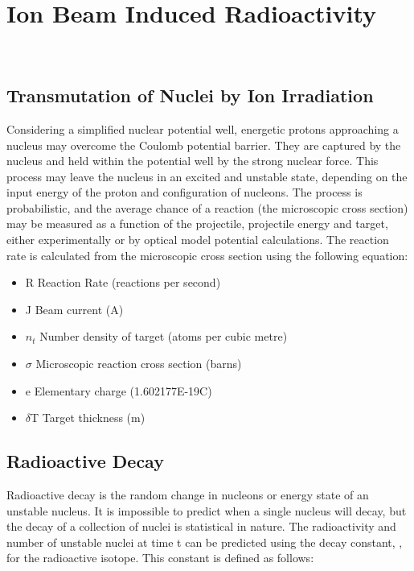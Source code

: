 
\section{Ion Beam Induced Radioactivity} 

\subsection{Transmutation of Nuclei by Ion Irradiation}

Considering a simplified nuclear potential well, energetic protons approaching a nucleus may overcome the Coulomb potential barrier.  They are captured by the nucleus and held within the potential well by the strong nuclear force.  This process may leave the nucleus in an excited and unstable state, depending on the input energy of the proton and configuration of nucleons.  The process is probabilistic, and the average chance of a reaction (the microscopic cross section) may be measured as a function of the projectile, projectile energy and target, either experimentally or by optical model potential calculations.  The reaction rate is calculated from the microscopic cross section using the following equation:

\eqReactionRate

\begin{itemize}
	\item R	Reaction Rate (reactions per second)
	\item J	Beam current (A)
	\item \ensuremath{n_t}	Number density of target (atoms per cubic metre)
	\item \ensuremath{\sigma}	Microscopic reaction cross section (barns)
	\item e	Elementary charge (1.602177E-19C)
	\item \ensuremath{\delta}T	Target thickness (m)
\end{itemize}

\subsection{Radioactive Decay}

Radioactive decay is the random change in nucleons or energy state of an unstable nucleus.  It is impossible to predict when a single nucleus will decay, but the decay of a collection of nuclei is statistical in nature.  The radioactivity and number of unstable nuclei at time t can be predicted using the decay constant, \textlambda, for the radioactive isotope.  This constant is defined as follows:

